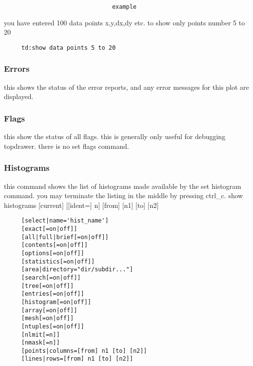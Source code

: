 \begin{verbatim}
                               example
\end{verbatim}
you  have entered 100 data points x,y,dx,dy etc.  to show only points
number 5 to 20 
\begin{verbatim}
     td:show data points 5 to 20 
\end{verbatim}
\subsubsection{Errors}
this  shows the status of the error reports, and any error messages for
this plot are displayed.  
\subsubsection{Flags}
this  show  the status of all flags.  this is generally only useful for
debugging topdrawer.  there is no set flags command.  
\subsubsection{Histograms}
this  command  shows  the  list  of  histograms  made  available by the
set histogram command.  you may terminate the listing in the middle  by
pressing ctrl\_c.  
show histograms [current] [[ident=] n] [from] [n1] [to] [n2] 
\begin{verbatim}
     [select|name='hist_name'] 
     [exact[=on|off]] 
     [all|full|brief[=on|off]] 
     [contents[=on|off]] 
     [options[=on|off]] 
     [statistics[=on|off]] 
     [area|directory="dir/subdir..."] 
     [search[=on|off]] 
     [tree[=on|off]] 
     [entries[=on|off]] 
     [histogram[=on|off]] 
     [array[=on|off]] 
     [mesh[=on|off]] 
     [ntuples[=on|off]] 
     [nlmit[=n]] 
     [nmask[=n]] 
     [points|columns=[from] n1 [to] [n2]] 
     [lines|rows=[from] n1 [to] [n2]] 
\end{verbatim}
